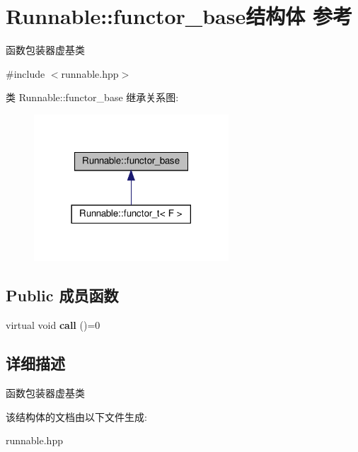 \hypertarget{structRunnable_1_1functor__base}{}\section{Runnable\+:\+:functor\+\_\+base结构体 参考}
\label{structRunnable_1_1functor__base}


函数包装器虚基类  




{\ttfamily \#include $<$runnable.\+hpp$>$}



类 Runnable\+:\+:functor\+\_\+base 继承关系图\+:\nopagebreak
\begin{figure}[H]
\begin{center}
\leavevmode
\includegraphics[width=206pt]{structRunnable_1_1functor__base__inherit__graph}
\end{center}
\end{figure}
\subsection*{Public 成员函数}
\begin{DoxyCompactItemize}
\item 
\mbox{\label{structRunnable_1_1functor__base_ab43e3c0a0e9f697ff88ec5f1e3256756}} 
virtual void {\bfseries call} ()=0
\end{DoxyCompactItemize}


\subsection{详细描述}
函数包装器虚基类 

该结构体的文档由以下文件生成\+:\begin{DoxyCompactItemize}
\item 
runnable.\+hpp\end{DoxyCompactItemize}
